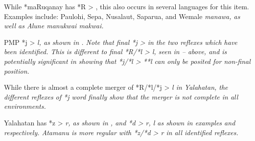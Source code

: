 While *maRuqanay has *R > {\0},
this also occurs in several  languages for this item.
Examples include: Paulohi, Sepa,
Nusalaut, Saparua, and Wemale \it{manawa}, as well as Alune \it{manukwai {\tl} makwai}.

PMP *j > \it{l},
as shown in .
Note that final *j > {\0} in the two reflexes which have been identified.
This is different to final *R/*l > \it{l},
seen in -- above,
and is potentially significant in showing that  *j/*l
> **l can only be posited for non-final position.


While there is almost a complete merger of *R/*l/*j > \it{l}
in Yalahatan, the different reflexes of *j word finally show that the merger
is not complete in all environments.

\largerpage
Yalahatan has *z > \it{r},
as shown in , and *d > \it{r,
l} as shown in examples  and  respectively.
Atamanu is more regular with *z/*d > \it{r} in all identified reflexes.
\\


